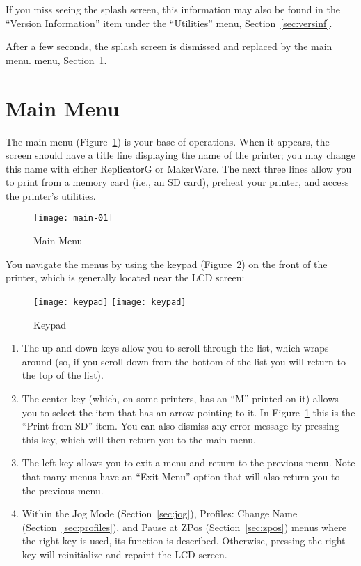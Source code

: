 If you miss seeing the splash screen, this information may also be found in the ``Version Information'' item under the ``Utilities'' menu, Section~\ref{sec:versinf}.

After a few seconds, the splash screen is dismissed and replaced by the main
\ifpdf
menu.
\else
menu, Section~\ref{sec:Main}.
\fi


\section{Main Menu}\label{sec:Main}

The main menu (Figure~\ref{fig:main}) is your base of operations.  When it appears, the screen should have a title line displaying the name of the printer; you may change this name with either ReplicatorG or MakerWare.  The next three lines allow you to print from a memory card (i.e., an \gls{SD card}), preheat your printer, and access the printer's utilities.  

\begin{figure}[!htbp]
  \centering
    \texttt{[image: main-01]}
    \caption{Main Menu}
  \label{fig:main}
\end{figure}

You navigate the menus by using the keypad (Figure~\ref{fig:keypad})  on the front of the printer, which is generally located near the LCD screen:

\begin{figure}[!htbp]
  \centering
\ifpdf
    \texttt{[image: keypad]}
\else
    \texttt{[image: keypad]}
\fi
    \caption{Keypad}
  \label{fig:keypad}
\end{figure}

\begin{enumerate}
\item The up and down keys allow you to scroll through the list, which wraps around (so, if you scroll down from the bottom of the list you will return to the top of the list).
\item The center key (which, on some printers, has an ``M'' printed on it) allows you to select the item that has an arrow pointing to it.  In Figure~\ref{fig:main} this is the ``Print from SD'' item.  You can also dismiss any error message by pressing this key, which will then return you to the main menu.
\item The left key allows you to exit a menu and return to the previous menu.  Note that many menus have an ``Exit Menu'' option that will also return you to the previous menu.
\item Within the Jog Mode (Section~\ref{sec:jog}), Profiles: Change Name (Section~\ref{sec:profiles}), and Pause at ZPos (Section~\ref{sec:zpos}) menus where the right key is used, its function is described.  Otherwise, pressing the right key will reinitialize and repaint the LCD screen.
\end{enumerate}

